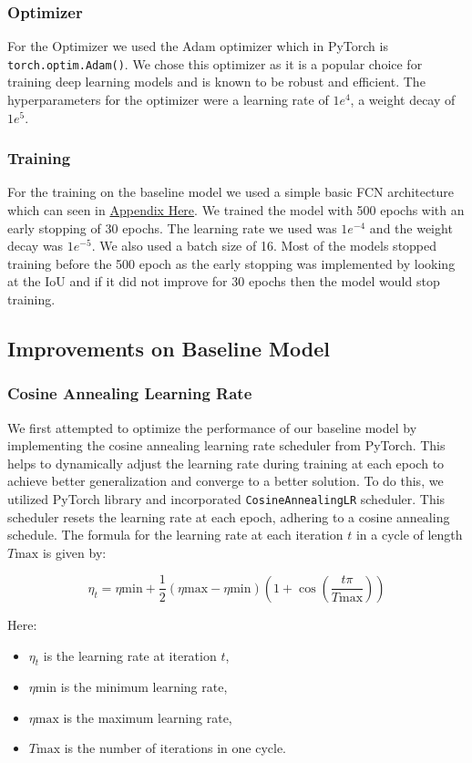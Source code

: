\documentclass{article}
\begin{document}
\subsubsection{Optimizer}
For the Optimizer we used the Adam optimizer which in PyTorch is
\texttt{torch.optim.Adam()}. We chose this optimizer
as it is a popular choice for training deep learning models and
is known to be robust and efficient. The hyperparameters for the
optimizer were a learning rate of $1e^4$, a weight decay of $1e^5$.


\subsubsection{Training}
For the training on the baseline model we used a simple basic FCN architecture which can
seen in \hyperref[sec:basic_fcn_architecture]{Appendix Here}. We trained the model
with 500 epochs with an early stopping of 30 epochs. The learning rate we used was
$1e^{-4}$ and the weight decay was $1e^{-5}$. We also used a batch size of 16. Most of the models stopped training before the 500 epoch as the early stopping was implemented by looking at the IoU and if it did not improve for 30 epochs then the model would stop training. 

\subsection{Improvements on Baseline Model}
\subsubsection{Cosine Annealing Learning Rate}
We first attempted to optimize the performance of our baseline model by implementing the cosine annealing learning rate scheduler from PyTorch. This helps to dynamically adjust the learning rate during training at each epoch to achieve better generalization and converge to a better solution. To do this, we utilized PyTorch library and incorporated \texttt{CosineAnnealingLR} scheduler. This scheduler resets the learning rate at each epoch, adhering to a cosine annealing schedule. The formula for the learning rate at each iteration $t$ in a cycle of length $T{\text{max}}$ is given by:

\[
  \eta_t = \eta{\text{min}} + \frac{1}{2} (\eta{\text{max}} - \eta{\text{min}}) \left(1 + \cos\left(\frac{t \pi}{T{\text{max}}}\right)\right)
\]

Here:
\begin{itemize}
  \item $\eta_t$ is the learning rate at iteration $t$,
  \item $\eta{\text{min}}$ is the minimum learning rate,
  \item $\eta{\text{max}}$ is the maximum learning rate,
  \item $T{\text{max}}$ is the number of iterations in one cycle.
\end{itemize}
\end{document}
